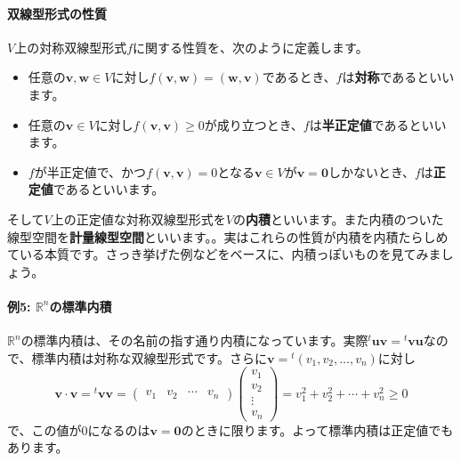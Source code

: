 \paragraph{双線型形式の性質} $V$上の対称双線型形式$f$に関する性質を、次のように定義します。
\begin{itemize}
\item 任意の$\bm{v}, \bm{w} \in V$に対し$f(\bm{v}, \bm{w}) = (\bm{w}, \bm{v})$であるとき、$f$は\textbf{対称}であるといいます。
\item 任意の$\bm{v} \in V$に対し$f(\bm{v}, \bm{v}) \geq 0$が成り立つとき、$f$は\textbf{半正定値}であるといいます。
\item $f$が半正定値で、かつ$f(\bm{v}, \bm{v}) = 0$となる$\bm{v} \in V$が$\bm{v} = \bm{0}$しかないとき、$f$は\textbf{正定値}であるといいます。
\end{itemize}
そして$V$上の正定値な対称双線型形式を$V$の\textbf{内積}といいます。また内積のついた線型空間を\textbf{計量線型空間}といいます。。実はこれらの性質が内積を内積たらしめている本質です。さっき挙げた例などをベースに、内積っぽいものを見てみましょう。

\paragraph{例5: $\mathbb{R}^n$の標準内積}

$\mathbb{R}^n$の標準内積は、その名前の指す通り内積になっています。実際${}^t\bm{u}\bm{v} = {}^t\bm{v}\bm{u}$なので、標準内積は対称な双線型形式です。さらに$\bm{v} = {}^t(v_1, v_2, \ldots, v_n)$に対し
\[
\bm{v} \cdot \bm{v} = 
{}^t\bm{v} \bm{v} = 
\begin{pmatrix}
v_1 & v_2 & \cdots & v_n
\end{pmatrix}
\begin{pmatrix}
v_1 \\
v_2 \\
\vdots \\
v_n
\end{pmatrix}
= v_1^2 + v_2^2 + \cdots + v_n^2 \geq 0
\]
で、この値が$0$になるのは$\bm{v} = \bm{0}$のときに限ります。よって標準内積は正定値でもあります。

